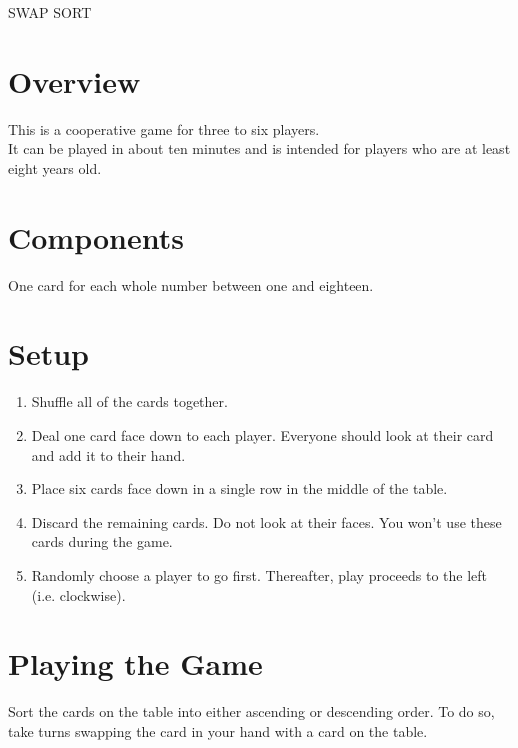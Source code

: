 \documentclass[a6paper, parskip=half, DIV=14, 10pt]{scrartcl}
\begin{document}
\setmainfont{Roboto}%
\raggedright%

\begin{center}
{
\setmainfont[Scale=1.65]{Roboto Slab-Bold}
\Huge
SWAP SORT
}
\end{center}

\section*{Overview}
This is a cooperative game for three to six players.\\It can be played in about ten minutes and is intended for players who are at least eight years old.

\section*{Components}
\begin{description}[leftmargin=0pt, labelsep=\widthof{\ }]
	\item[Numbered Cards (18) \textendash] One card for each whole number between one and eighteen.
\end{description}

\section*{Setup}
\begin{enumerate}[leftmargin=*]
	\item Shuffle all of the cards together. 
	\item Deal one card face down to each player. Everyone should look at their card and add it to their hand. 
	\item Place six cards face down in a single row in the middle of the table. 
	\item Discard the remaining cards. Do not look at their faces. You won't use these cards during the game.
	\item Randomly choose a player to go first. Thereafter, play proceeds to the left (i.e. clockwise).
\end{enumerate}

\newpage

\section*{Playing the Game}
Sort the cards on the table into either ascending or descending order.
To do so, take turns swapping the card in your hand with a card on the table.
\end{document}
